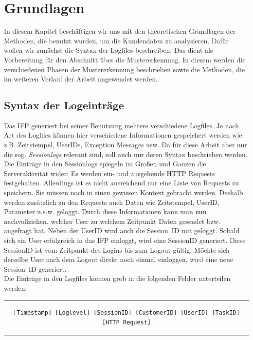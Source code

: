 \section{Grundlagen}\raggedbottom
\label{sec:Grundlagen}
In diesem Kapitel beschäftigen wir uns mit den theoretischen Grundlagen der Methoden, die benutzt wurden, um die Kundendaten zu analysieren. Dafür wollen wir zunächst die Syntax der Logfiles beschreiben. Das dient als Vorbereitung für den Abschnitt über die Mustererkennung. In diesem werden die verschiedenen Phasen der Mustererkennung beschrieben sowie die Methoden, die im weiteren Verlauf der Arbeit angewendet werden.

\subsection{Syntax der Logeinträge}
\label{sub:Aufbau der Logeinträge}
Das IFP generiert bei seiner Benutzung mehrere verschiedene Logfiles. Je nach Art des Logfiles können hier verschiedene Informationen gespeichert werden wie z.B. Zeitstempel, UserIDs, Exception Messages usw. Da für diese Arbeit aber nur die sog. \textit{Sessionlogs} relevant sind, soll auch nur deren Syntax beschrieben werden.\\
Die Einträge in den Sessionlogs spiegeln im Großen und Ganzen die Serveraktivität wider: Es werden ein- und ausgehende HTTP Requests festgehalten. Allerdings ist es nicht ausreichend nur eine Liste von Requests zu speichern. Sie müssen noch in einen gewissen Kontext gebracht werden. Deshalb werden zusätzlich zu den Requests auch Daten wie Zeitstempel, UserID, Parameter u.s.w. geloggt. Durch diese Informationen kann man nun nachvollziehen, welcher User zu welchem Zeitpunkt Daten gesendet bzw. angefragt hat. Neben der UserID wird auch die Session~ID mit geloggt. Sobald sich ein User erfolgreich in das IFP einloggt, wird eine SessionID generiert. Diese Session\-ID ist vom Zeitpunkt des Logins bis zum Logout gültig. Möchte sich derselbe User nach dem Logout direkt noch einmal einloggen, wird eine neue Session~ID generiert.\\
Die Einträge in den Logfiles können grob in die folgenden Felder unterteilen werden:\\

\begin{center}
	\begin{tabular}{c}
		\begin{lstlisting}[numbers=none, basicstyle=\scriptsize,caption=Felder in Sessionlogs,captionpos=b,label=lst:tab_session_fields]
[Timestamp] [Loglevel] [SessionID] [CustomerID] [UserID] [TaskID] [HTTP Request]
		\end{lstlisting}
	\end{tabular}
\end{center}


